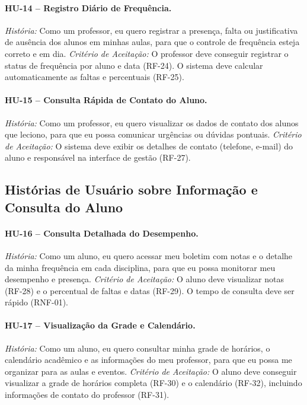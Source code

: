 \paragraph{HU-14 -- Registro Diário de Frequência.}
\textit{História:} Como um professor, eu quero registrar a presença, falta
ou justificativa de ausência dos alunos em minhas aulas, para que o
controle de frequência esteja correto e em dia.
\textit{Critério de Aceitação:} O professor deve conseguir registrar o
status de frequência por aluno e data (RF-24). O sistema deve calcular
automaticamente as faltas e percentuais (RF-25).

\paragraph{HU-15 -- Consulta Rápida de Contato do Aluno.}
\textit{História:} Como um professor, eu quero visualizar os dados de
contato dos alunos que leciono, para que eu possa comunicar urgências ou
dúvidas pontuais.
\textit{Critério de Aceitação:} O sistema deve exibir os detalhes de
contato (telefone, e-mail) do aluno e responsável na interface de gestão
(RF-27).

\subsection{Histórias de Usuário sobre Informação e Consulta do Aluno}

\paragraph{HU-16 -- Consulta Detalhada do Desempenho.}
\textit{História:} Como um aluno, eu quero acessar meu boletim com notas e
o detalhe da minha frequência em cada disciplina, para que eu possa
monitorar meu desempenho e presença.
\textit{Critério de Aceitação:} O aluno deve visualizar notas (RF-28) e o
percentual de faltas e datas (RF-29). O tempo de consulta deve ser rápido
(RNF-01).

\paragraph{HU-17 -- Visualização da Grade e Calendário.}
\textit{História:} Como um aluno, eu quero consultar minha grade de
horários, o calendário acadêmico e as informações do meu professor, para
que eu possa me organizar para as aulas e eventos.
\textit{Critério de Aceitação:} O aluno deve conseguir visualizar a grade
de horários completa (RF-30) e o calendário (RF-32), incluindo informações
de contato do professor (RF-31).

